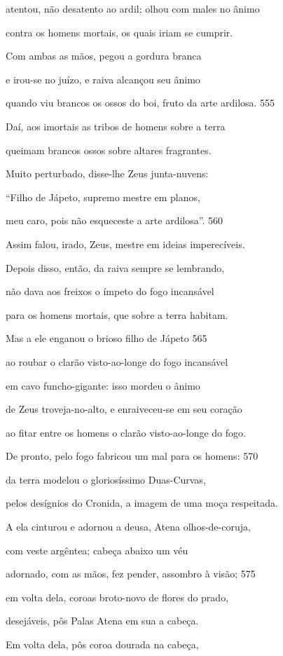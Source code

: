 atentou, não desatento ao ardil; olhou com males no ânimo

contra os homens mortais, os quais iriam se cumprir.

Com ambas as mãos, pegou a gordura branca

e irou-se no juízo, e raiva alcançou seu ânimo

quando viu brancos os ossos do boi, fruto da arte ardilosa. \num{555}

Daí, aos imortais as tribos de homens sobre a terra

queimam brancos ossos sobre altares fragrantes.

\quad{}Muito perturbado, disse-lhe Zeus junta-nuvens:

``Filho de Jápeto, supremo mestre em planos,

meu caro, pois não esqueceste a arte ardilosa''. \num{560}

\quad{}Assim falou, irado, Zeus, mestre em ideias imperecíveis.

Depois disso, então, da raiva sempre se lembrando,

não dava aos freixos o ímpeto do fogo incansável

para os homens mortais, que sobre a terra habitam.

Mas a ele enganou o brioso filho de Jápeto \num{565}

ao roubar o clarão visto-ao-longe do fogo incansável

em cavo funcho-gigante: isso mordeu o ânimo

de Zeus troveja-no-alto, e enraiveceu-se em seu coração

ao fitar entre os homens o clarão visto-ao-longe do fogo.

De pronto, pelo fogo fabricou um mal para os homens: \num{570}

da terra modelou o gloriosíssimo Duas-Curvas,

pelos desígnios do Cronida, a imagem de uma moça respeitada.

A ela cinturou e adornou a deusa, Atena olhos-de-coruja,

com veste argêntea; cabeça abaixo um véu

adornado, com as mãos, fez pender, assombro à visão; \num{575}

em volta dela, coroas broto-novo de flores do prado,

desejáveis, pôs Palas Atena em sua a cabeça.

Em volta dela, pôs coroa dourada na cabeça,

